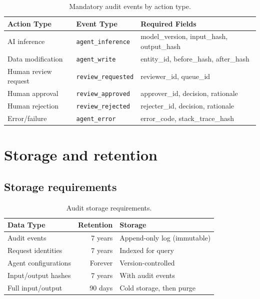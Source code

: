 \begin{table}[htbp]
\centering
\caption{Mandatory audit events by action type.}
\label{tab:audit-events}
\footnotesize
\begin{tabularx}{\linewidth}{@{}l l X@{}}
\toprule
\textbf{Action Type} & \textbf{Event Type} & \textbf{Required Fields} \\ \midrule
AI inference & \texttt{agent\_inference} & model\_version, input\_hash, output\_hash \\
Data modification & \texttt{agent\_write} & entity\_id, before\_hash, after\_hash \\
Human review request & \texttt{review\_requested} & reviewer\_id, queue\_id \\
Human approval & \texttt{review\_approved} & approver\_id, decision, rationale \\
Human rejection & \texttt{review\_rejected} & rejecter\_id, decision, rationale \\
Error/failure & \texttt{agent\_error} & error\_code, stack\_trace\_hash \\
\bottomrule
\end{tabularx}
\end{table}

\section{Storage and retention}

\subsection{Storage requirements}

\begin{table}[htbp]
\centering
\caption{Audit storage requirements.}
\label{tab:audit-storage}
\footnotesize
\begin{tabularx}{\linewidth}{@{}l r X@{}}
\toprule
\textbf{Data Type} & \textbf{Retention} & \textbf{Storage} \\ \midrule
Audit events & 7 years & Append-only log (immutable) \\
Request identities & 7 years & Indexed for query \\
Agent configurations & Forever & Version-controlled \\
Input/output hashes & 7 years & With audit events \\
Full input/output & 90 days & Cold storage, then purge \\
\bottomrule
\end{tabularx}
\end{table}

